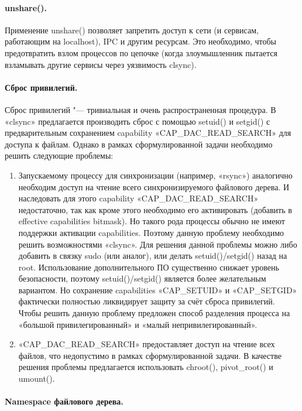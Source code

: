 \documentclass[10pt, a5paper]{article}
\begin{document}
\paragraph{unshare().}

Применение unshare() позволяет запретить доступ к сети (и сервисам, работающим на localhost), IPC и другим ресурсам. Это необходимо, чтобы предотвратить взлом процессов по цепочке (когда злоумышленник пытается взламывать другие сервисы через уязвимость clsync).

\paragraph{Сброс привилегий.}

Сброс привилегий "--- тривиальная и очень распространенная процедура. В «clsync» предлагается производить сброс с помощью setuid() и setgid() с предварительным сохранением capability «CAP\_DAC\_READ\_SEARCH» для доступа к файлам. Однако в рамках сформулированной задачи необходимо решить следующие проблемы:

\begin{enumerate}
  \item Запускаемому процессу для синхронизации (например, \linebreak «rsync») аналогично необходим доступ на чтение всего синхронизируемого файлового дерева. И наследовать для этого capability «CAP\_DAC\_READ\_SEARCH» недостаточно, так как кроме этого необходимо его активировать (добавить в effective capabilities bitmask). Но такого рода процессы обычно не имеют поддержки активации capabilities. Поэтому данную проблему необходимо решить возможностями «clsync». Для решения данной проблемы можно либо добавить в связку sudo (или аналог), или делать setuid()/setgid() назад на root. Использование дополнительного ПО существенно снижает уровень безопасности, поэтому setuid()/setgid() является более желательным вариантом. Но сохранение capabilities «CAP\_SETUID» и «CAP\_SETGID» фактически полностью ликвидирует защиту за счёт сброса привилегий. Чтобы решить данную проблему предложен способ разделения процесса на «большой привилегированный» и «малый непривилегированный».
  \item «CAP\_DAC\_READ\_SEARCH» предоставляет доступ на чтение всех файлов, что недопустимо в рамках сформулированной задачи. В качестве решения проблемы предлагается использовать chroot(), pivot\_root() и umount().
\end{enumerate}

\paragraph{Namespace файлового дерева.}
\end{document}

